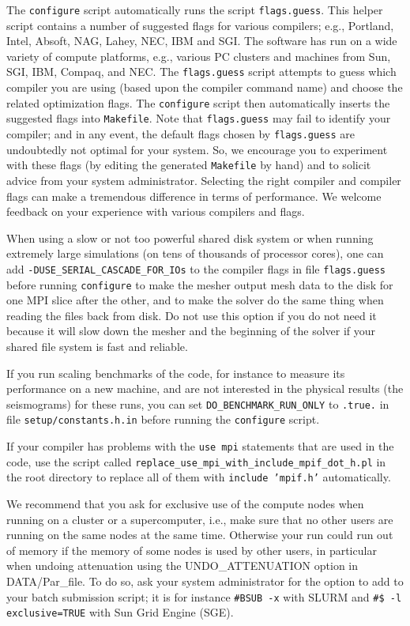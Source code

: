 The \texttt{configure} script automatically runs the script \texttt{flags.guess}.
This helper script contains a number of suggested flags for various
compilers; e.g., Portland, Intel, Absoft, NAG, Lahey, NEC, IBM and
SGI. The software has run on a wide variety of compute platforms,
e.g., various PC clusters and machines from Sun, SGI, IBM, Compaq,
and NEC. The \texttt{flags.guess} script attempts to guess which compiler
you are using (based upon the compiler command name) and choose the
related optimization flags. The \texttt{configure} script then automatically
inserts the suggested flags into \texttt{Makefile}. Note that \texttt{flags.guess}
may fail to identify your compiler; and in any event, the default
flags chosen by \texttt{flags.guess} are undoubtedly not optimal for
your system. So, we encourage you to experiment with these flags (by
editing the generated \texttt{Makefile} by hand) and to solicit advice
from your system administrator. Selecting the right compiler and compiler
flags can make a tremendous difference in terms of performance. We
welcome feedback on your experience with various compilers and flags.\newline


When using a slow or not too powerful shared disk system or when running extremely large simulations
(on tens of thousands of processor cores), one can add \texttt{-DUSE\_SERIAL\_CASCADE\_FOR\_IOs} to the compiler flags
in file \texttt{flags.guess} before running \texttt{configure} to make the mesher output mesh data
to the disk for one MPI slice after the other, and to make the solver do the same thing when reading the files back from disk.
Do not use this option if you do not need it because it will slow down the mesher and the beginning of the solver if your
shared file system is fast and reliable.


If you run scaling benchmarks of the code, for instance to measure its performance on a new machine, and are not interested in the physical results
(the seismograms) for these runs, you can set \texttt{DO\_BENCHMARK\_RUN\_ONLY} to \texttt{.true.} in file \texttt{setup/constants.h.in} before running the \texttt{configure} script.


If your compiler has problems with the \texttt{use mpi} statements that are used in the code, use the script called
\texttt{replace\_use\_mpi\_with\_include\_mpif\_dot\_h.pl} in the root directory to replace all of them with \texttt{include 'mpif.h'} automatically.


We recommend that you ask for exclusive use of the compute nodes when running on a cluster or a supercomputer, i.e., make sure that no other users
are running on the same nodes at the same time. Otherwise your run could run out of memory if the memory of some nodes is used by other users, in particular
when undoing attenuation using the UNDO\_ATTENUATION option in DATA/Par\_file.
To do so, ask your system administrator for the option to add to your batch submission script; it is for instance
\texttt{\#BSUB -x} with SLURM and \texttt{\#\$ -l exclusive=TRUE} with Sun Grid Engine (SGE).


